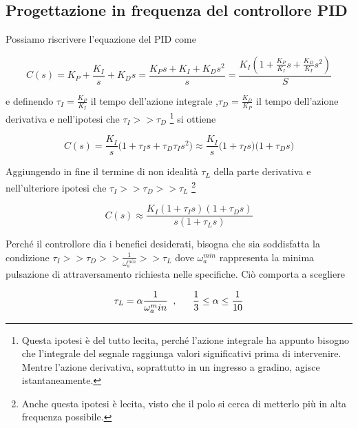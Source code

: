 	
	\subsection{Progettazione in frequenza del controllore PID}
	\label{sub:ProgettazionePID}
	
		Possiamo riscrivere l'equazione del PID come
		
		\begin{equation}
			C(s)=K_P + \frac{K_I}{s} + K_Ds=\frac{K_Ps+K_I+K_Ds^2}{s}=\frac{K_I(1+\frac{K_P}{K_I}s+\frac{K_D}{K_I}s^2)}{S}
			\label{eq:PIDriscritto}
		\end{equation}
		
		\noindent e definendo $\tau_I=\frac{K_P}{K_I}$ il tempo dell'azione integrale ,$\tau_D=\frac{K_D}{K_P}$ il tempo dell'azione derivativa e nell'ipotesi che $\tau_I>>\tau_D$ \footnote{Questa ipotesi è del tutto lecita, perché l'azione integrale ha appunto bisogno che l'integrale del segnale raggiunga valori significativi prima di intervenire. Mentre l'azione derivativa, soprattutto in un ingresso a gradino, agisce istantaneamente.} si ottiene 
		
		\begin{equation}
			C(s)=\frac{K_I}{s}\bigl(1+\tau_Is+\tau_D\tau_Is^2\bigl) \approx \frac{K_I}{s}\bigl(1+\tau_Is\bigl)\bigl(1+\tau_Ds\bigl)
			\label{eq:PIDtau}
		\end{equation}
		
		\noindent Aggiungendo in fine il termine di non idealità $\tau_L$ della parte derivativa e nell'ulteriore ipotesi che $\tau_I>>\tau_D>>\tau_L$ \footnote{Anche questa ipotesi è lecita, visto che il polo si cerca di metterlo più in alta frequenza possibile.}
		
		\begin{equation}
			C(s) \approx \frac{K_I(1+\tau_Is)(1+\tau_Ds)}{s(1+\tau_Ls)}
			\label{eq:PIDfinale}
		\end{equation}
	
		\noindent Perché il controllore dia i benefici desiderati, bisogna che sia soddisfatta la condizione $\tau_I>>\tau_D>>\frac{1}{\omega_a^{min}}>>\tau_L$ dove $\omega_a^{min}$ rappresenta la minima pulsazione di attraversamento richiesta nelle specifiche. Ciò comporta a scegliere
		
		\begin{equation}
			\tau_L=\alpha\frac{1}{\omega_a^min} \singleSpacing, \trippleSpacing \frac{1}{3}\le\alpha\le\frac{1}{10}
			\label{eq:tauL}
		\end{equation}
		
